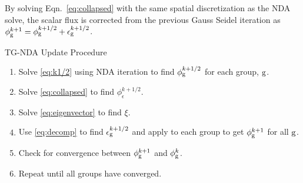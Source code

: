   By solving Eqn.~\eqref{eq:collapsed} with the same spatial discretization as the NDA solve, the scalar flux is corrected from the previous Gauss Seidel iteration as $\phi_{\mathrm{g}}^{k+1} = \phi_{\mathrm{g}}^{k+1/2} + \epsilon_{\mathrm{g}}^{k+1/2}$.

  TG-NDA Update Procedure
  \begin{enumerate}
      \item Solve \eqref{eq:k1/2} using NDA iteration to find $\phi_{\mathrm{g}}^{k+1/2}$ for each group, $\mathrm{g}$. 
      \item Solve \eqref{eq:collapsed} to find $\phi_\epsilon^{k+1/2}$. 
      \item Solve \eqref{eq:eigenvector} to find $\xi$. 
      \item Use \eqref{eq:decomp} to find $\epsilon_{\mathrm{g}}^{k+1/2}$ and apply to each group to get $\phi_{\mathrm{g}}^{k+1}$ for all $\mathrm{g}$. 
      \item Check for convergence between $\phi_{\mathrm{g}}^{k+1}$ and $\phi_{\mathrm{g}}^{k}$.
      \item Repeat until all groups have converged.
  \end{enumerate}
